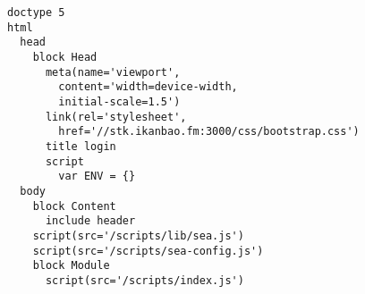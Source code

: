 
\lstset{language=lisp}

\begin{lstlisting}[frame=single]
doctype 5
html
  head
    block Head
      meta(name='viewport', 
      	content='width=device-width, 
      	initial-scale=1.5')
      link(rel='stylesheet', 
      	href='//stk.ikanbao.fm:3000/css/bootstrap.css')
      title login
      script
        var ENV = {}
  body
    block Content
      include header
    script(src='/scripts/lib/sea.js')
    script(src='/scripts/sea-config.js')
    block Module
      script(src='/scripts/index.js')
\end{lstlisting}